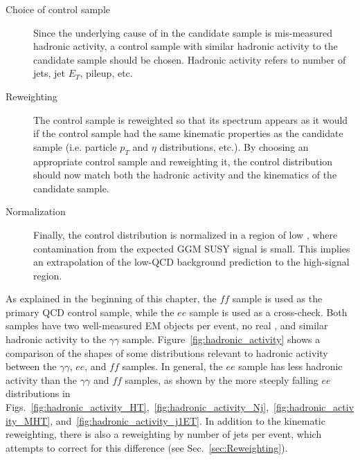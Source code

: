 \documentclass[dissertation.tex]{subfiles}
\begin{document}
\begin{description}
\item[Choice of control sample] Since the underlying cause of \MET in the candidate sample is mis-measured hadronic activity, a control sample with similar hadronic activity to the candidate sample should be chosen.  Hadronic activity refers to number of jets, jet $E_{T}$, pileup, etc.
\item[Reweighting] The control sample is reweighted so that its \MET spectrum appears as it would if the control sample had the same kinematic properties as the candidate sample (i.e. particle $p_{T}$ and $\eta$ distributions, etc.).  By choosing an appropriate control sample and reweighting it, the control \MET distribution should now match both the hadronic activity and the kinematics of the candidate sample.
\item[Normalization] Finally, the control \MET distribution is normalized in a region of low \MET, where contamination from the expected GGM SUSY signal is small.  This implies an extrapolation of the low-\MET QCD background prediction to the high-\MET signal region.
\end{description}

As explained in the beginning of this chapter, the $\mathit{ff}$ sample is used as the primary QCD control sample, while the $ee$ sample is used as a cross-check.  Both samples have two well-measured EM objects per event, no real \MET, and similar hadronic activity to the $\gamma\gamma$ sample.  Figure~\ref{fig:hadronic_activity} shows a comparison of the shapes of some distributions relevant to hadronic activity between the $\gamma\gamma$, $ee$, and $\mathit{ff}$ samples.  In general, the $ee$ sample has less hadronic activity than the $\gamma\gamma$ and $\mathit{ff}$ samples, as shown by the more steeply falling $ee$ distributions in Figs.~\ref{fig:hadronic_activity_HT},~\ref{fig:hadronic_activity_Nj},~\ref{fig:hadronic_activity_MHT}, and~\ref{fig:hadronic_activity_j1ET}.  In addition to the kinematic reweighting, there is also a reweighting by number of jets per event, which attempts to correct for this difference (see Sec.~\ref{sec:Reweighting}).
\end{document}
